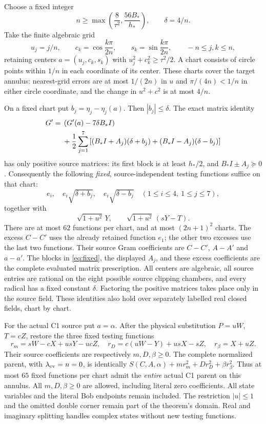 \documentclass[11pt]{article}
\begin{document}
Choose a fixed integer
\[
 n\geq\max\left(\frac8{\tau^2},\frac{56B_*}{h_*}\right),
 \qquad \delta=4/n.
\]
Take the finite algebraic grid
\[
 u_j=j/n,\qquad
 c_k=\cos\frac{k\pi}{2n},\qquad
 s_k=\sin\frac{k\pi}{2n},\qquad -n\leq j,k\leq n,
\]
retaining centers $a=(u_j,c_k,s_k)$ with
$u_j^2+c_k^2\geq\tau^2/2$.  A chart consists of circle points within
$1/n$ in each coordinate of its center.  These charts cover the
target annulus: nearest-grid errors are at most $1/(2n)$ in $u$
and $\pi/(4n)<1/n$ in either circle coordinate, and the change in
$u^2+c^2$ is at most $4/n$.

On a fixed chart put $b_j=\eta_j-\eta_j(a)$.
Then $|b_j|\leq\delta$.  The exact matrix identity
\begin{align}
 G'={}&\left(G'(a)-7\delta B_* I\right)\notag\\
 &+\frac12\sum_{j=1}^7
  \left[(B_*I+A_j)(\delta+b_j)
          +(B_*I-A_j)(\delta-b_j)\right]          \label{eq:fixed}
\end{align}
has only positive source matrices: its first block is at least
$h_*/2$, and $B_*I\pm A_j\succeq0$.  Consequently the following
\emph{fixed}, source-independent testing functions suffice on that chart:
\[
 e_i,\quad e_i\sqrt{\delta+b_j},\quad
 e_i\sqrt{\delta-b_j}\quad(1\leq i\leq4,\ 1\leq j\leq7),
\]
together with
\[
 \sqrt{1+u^2}\,Y,\qquad
 \sqrt{1+u^2}\,(sY-T).
\]
There are at most $62$ functions per chart, and at most
$(2n+1)^2$ charts.  The excess $C-C'$ uses the already retained
function $e_1$; the other two excesses use the last two functions.
Their source Gram coefficients are $C-C'$, $A-A'$ and $a-a'$.
The blocks in \eqref{eq:fixed}, the displayed $A_j$, and these excess
coefficients are the complete evaluated matrix prescription.  All
centers are algebraic, all source entries are rational on the eight
possible source clipping chambers, and every radical has a fixed
constant $\delta$.  Factoring the positive matrices takes place only
in the source field.  These identities also hold over separately
labelled real closed fields, chart by chart.

For the actual C1 source put $a=\alpha$.  After the physical substitution
$P=uW$, $T=cZ$, restore the three fixed testing functions
\[
 r_m=sW-cX+usY-ucZ,\quad
 r_D=c(uW-Y)+usX-sZ,\quad r_\beta=X+uZ.
\]
Their source coefficients are respectively $m,D,\beta\geq0$.
The complete normalized parent, with $\lambda_{\rm ev}=n=0$, is
identically $S(C,A,\alpha)+mr_m^2+Dr_D^2+\beta r_\beta^2$.
Thus at most $65$ fixed functions per chart admit the \emph{entire}
actual C1 parent on this annulus.  All $m,D,\beta\geq0$ are allowed,
including literal zero coefficients.  All state variables and the
literal Bob endpoints remain included.  The restriction $|u|\leq1$
and the omitted double corner remain part of the theorem's domain.
Real and imaginary splitting handles complex states without new
testing functions.
\end{document}
